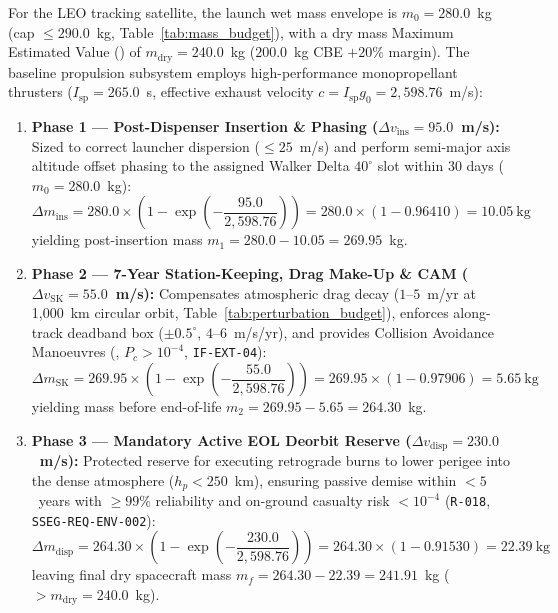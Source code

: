 For the LEO tracking satellite, the launch wet mass envelope is $m_0 = 280.0$~kg (cap $\le 290.0$~kg, Table~\ref{tab:mass_budget}), with a dry mass Maximum Estimated Value () of $m_{\text{dry}} = 240.0$~kg ($200.0$~kg CBE $+ 20\%$ margin). The baseline propulsion subsystem employs high-performance monopropellant thrusters ($I_{\text{sp}} = 265.0$~s, effective exhaust velocity $c = I_{\text{sp}} g_0 = 2{,}598.76$~m/s):
\begin{enumerate}
    \item \textbf{Phase 1 --- Post-Dispenser Insertion \& Phasing ($\Delta v_{\text{ins}} = 95.0$~m/s):} Sized to correct launcher dispersion ($\le 25$~m/s) and perform semi-major axis altitude offset phasing to the assigned Walker Delta $40^\circ$ slot within 30 days ($m_0 = 280.0$~kg):
    \begin{equation}
        \Delta m_{\text{ins}} = 280.0 \times \left(1 - \exp\left(-\frac{95.0}{2{,}598.76}\right)\right) = 280.0 \times (1 - 0.96410) = 10.05~\text{kg}
    \end{equation}
    yielding post-insertion mass $m_1 = 280.0 - 10.05 = 269.95$~kg.
    
    \item \textbf{Phase 2 --- 7-Year Station-Keeping, Drag Make-Up \& CAM ($\Delta v_{\text{SK}} = 55.0$~m/s):} Compensates atmospheric drag decay ($1\text{--}5$~m/yr at 1,000~km circular orbit, Table~\ref{tab:perturbation_budget}), enforces along-track deadband box ($\pm 0.5^\circ$, $4\text{--}6$~m/s/yr), and provides Collision Avoidance Manoeuvres (, $P_c > 10^{-4}$, \texttt{IF-EXT-04}):
    \begin{equation}
        \Delta m_{\text{SK}} = 269.95 \times \left(1 - \exp\left(-\frac{55.0}{2{,}598.76}\right)\right) = 269.95 \times (1 - 0.97906) = 5.65~\text{kg}
    \end{equation}
    yielding mass before end-of-life $m_2 = 269.95 - 5.65 = 264.30$~kg.
    
    \item \textbf{Phase 3 --- Mandatory Active EOL Deorbit Reserve ($\Delta v_{\text{disp}} = 230.0$~m/s):} Protected reserve for executing retrograde burns to lower perigee into the dense atmosphere ($h_p < 250$~km), ensuring passive demise within $< 5$~years with $\ge 99\%$ reliability and on-ground casualty risk $< 10^{-4}$ (\texttt{R-018}, \texttt{SSEG-REQ-ENV-002}):
    \begin{equation}
        \Delta m_{\text{disp}} = 264.30 \times \left(1 - \exp\left(-\frac{230.0}{2{,}598.76}\right)\right) = 264.30 \times (1 - 0.91530) = 22.39~\text{kg}
    \end{equation}
    leaving final dry spacecraft mass $m_f = 264.30 - 22.39 = 241.91$~kg ($> m_{\text{dry}} = 240.0$~kg).
\end{enumerate}

